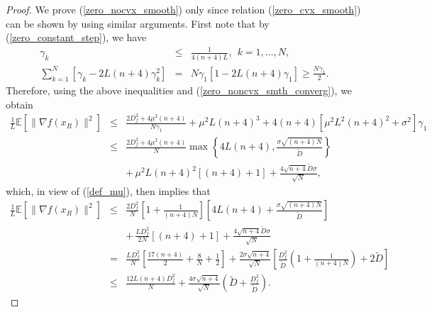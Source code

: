 \documentclass[final]{siamltex}
\newcommand{\beqa}{\begin{eqnarray}}
\newcommand{\eeqa}{\end{eqnarray}}
\newcommand{\beqas}{\begin{eqnarray*}}
\newcommand{\eeqas}{\end{eqnarray*}}
\def\eqnok#1{(\ref{#1})}
\def\vgap{\vspace*{.1in}}
\newcommand{\bbe}{\mathbb{E}}
\begin{document}
\begin{proof}
We prove \eqnok{zero_nocvx_smooth} only since relation \eqnok{zero_cvx_smooth} can be shown by using similar arguments.
First note that by \eqnok{zero_constant_step}, we have
\beqa
\gamma_k &\le& \frac{1}{4(n+4)L}, \ \ k = 1, \ldots, N, \\
\sum_{k=1}^N \left[\gamma_k - 2 L(n+4) \gamma_k^2 \right] &=& N \gamma_1 \left[1 - 2 L(n+4) \gamma_1 \right] \ge \frac {N \gamma_1}{2}.
\eeqa
Therefore, using the above inequalities and \eqnok{zero_noncvx_smth_converg}, we obtain
\beqas
\frac{1}{L} \bbe[\|\nabla f(x_R)\|^2] &\le& \frac{2 D_f^2 + 4 \mu^2(n+4)}{N \gamma_1} + \mu^2 L(n+4)^3 + 4(n+4) \left[ \mu^2 L^2(n+4)^2 + \sigma^2 \right] \gamma_1  \\
&\le& \frac{2 D_f^2+ 4 \mu^2(n+4)}{N}\max\left\{4 L(n+4), \frac{\sigma \sqrt{(n+4)N}}{\tilde D} \right\}  \\
&& + \, \mu^2 L (n+4)^2\left[(n+4) + 1 \right] + \frac {4 \sqrt {n+4}\tilde D \sigma} {\sqrt N},
\eeqas
which, in view of \eqnok{def_mu}, then implies that
\beqas
\frac{1}{L} \bbe[\|\nabla f(x_R)\|^2]&\le& \frac{2 D_f^2}{N} \left[ 1 + \frac{1}{(n+4) N}\right] \left[4 L(n+4) + \frac{\sigma \sqrt{(n+4)N}}{\tilde D} \right]\\
&& + \, \frac{L D_f^2}{2N} \left[(n+4) + 1\right] + \frac {4 \sqrt {n+4}\tilde D \sigma} {\sqrt N}\\
&=& \frac{LD_f^2}{N}\left[\frac{17(n+4)}{2} + \frac{8}{N} + \frac{1}{2} \right]
+ \frac{2 \sigma \sqrt {n+4} }{\sqrt N}
\left[ \frac{D_f^2}{\tilde D}\left(1+\frac{1}{(n+4)N} \right) + 2 \tilde D \right ]  \\
&\le& \frac{12 L(n+4) D_f^2}{N} + \frac{4 \sigma \sqrt {n+4}}{\sqrt{N}} \left(\tilde D + \frac{D_f^2}{\tilde D} \right).
\eeqas
\end{proof}


\vgap
\end{document}
